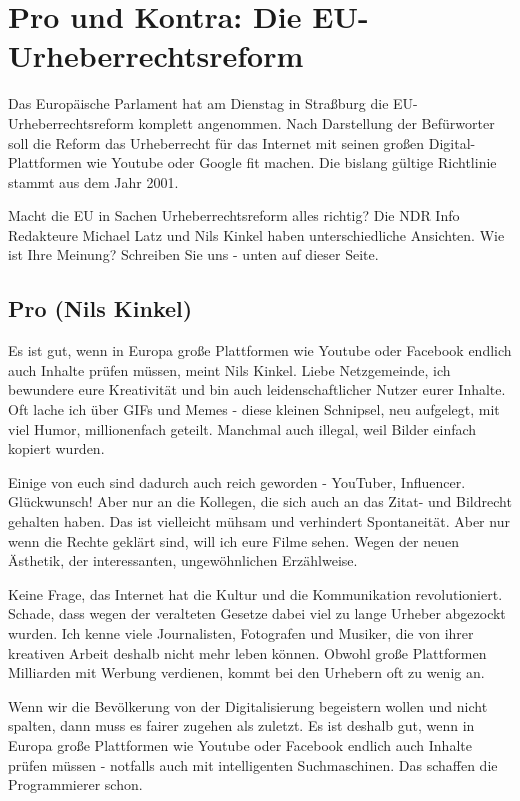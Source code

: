 \documentclass[9pt, a4paper]{scrartcl}
\newcommand{\keineNr}[1][-1]{\addtocounter{linenumber}{#1}}
\begin{document}
\section*{Pro und Kontra: Die EU-Urheberrechtsreform}
\begin{zeilenNrZweispaltig}
Das Europäische Parlament hat am Dienstag in Straßburg die EU-Urheberrechtsreform komplett angenommen. Nach Darstellung der Befürworter soll die Reform das Urheberrecht für das Internet mit seinen großen Digital-Plattformen wie Youtube oder Google fit machen. Die bislang gültige Richtlinie stammt aus dem Jahr 2001.

Macht die EU in Sachen Urheberrechtsreform alles richtig? Die NDR Info Redakteure Michael Latz und Nils Kinkel haben unterschiedliche Ansichten. Wie ist Ihre Meinung? Schreiben Sie uns - unten auf dieser Seite.

\subsection*{Pro (Nils Kinkel)}\keineNr
Es ist gut, wenn in Europa große Plattformen wie Youtube oder Facebook endlich auch Inhalte prüfen müssen, meint Nils Kinkel.
Liebe Netzgemeinde, ich bewundere eure Kreativität und bin auch leidenschaftlicher Nutzer eurer Inhalte. Oft lache ich über GIFs und Memes - diese kleinen Schnipsel, neu aufgelegt, mit viel Humor, millionenfach geteilt. Manchmal auch illegal, weil Bilder einfach kopiert wurden.

Einige von euch sind dadurch auch reich geworden - YouTuber, Influencer. Glückwunsch! Aber nur an die Kollegen, die sich auch an das Zitat- und Bildrecht gehalten haben. Das ist vielleicht mühsam und verhindert Spontaneität. Aber nur wenn die Rechte geklärt sind, will ich eure Filme sehen. Wegen der neuen Ästhetik, der interessanten, ungewöhnlichen Erzählweise.

Keine Frage, das Internet hat die Kultur und die Kommunikation revolutioniert. Schade, dass wegen der veralteten Gesetze dabei viel zu lange Urheber abgezockt wurden. Ich kenne viele Journalisten, Fotografen und Musiker, die von ihrer kreativen Arbeit deshalb nicht mehr leben können. Obwohl große Plattformen Milliarden mit Werbung verdienen, kommt bei den Urhebern oft zu wenig an.

Wenn wir die Bevölkerung von der Digitalisierung begeistern wollen und nicht spalten, dann muss es fairer zugehen als zuletzt. Es ist deshalb gut, wenn in Europa große Plattformen wie Youtube oder Facebook endlich auch Inhalte prüfen müssen - notfalls auch mit intelligenten Suchmaschinen. Das schaffen die Programmierer schon.


\end{zeilenNrZweispaltig}
\end{document}
